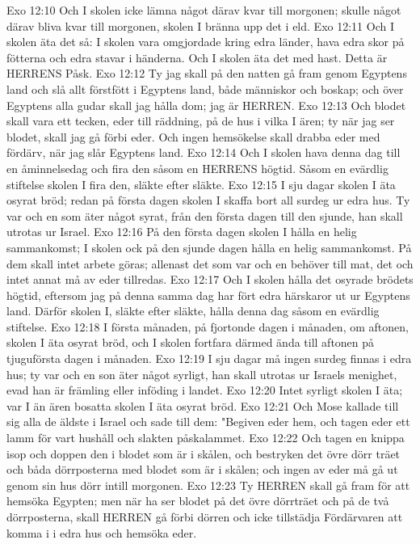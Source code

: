 Exo 12:10  Och I skolen icke lämna något därav kvar till morgonen; skulle något därav bliva kvar till morgonen, skolen I bränna upp det i eld.
Exo 12:11  Och I skolen äta det så: I skolen vara omgjordade kring edra länder, hava edra skor på fötterna och edra stavar i händerna. Och I skolen äta det med hast. Detta är HERRENS Påsk.
Exo 12:12  Ty jag skall på den natten gå fram genom Egyptens land och slå allt förstfött i Egyptens land, både människor och boskap; och över Egyptens alla gudar skall jag hålla dom; jag är HERREN.
Exo 12:13  Och blodet skall vara ett tecken, eder till räddning, på de hus i vilka I ären; ty när jag ser blodet, skall jag gå förbi eder. Och ingen hemsökelse skall drabba eder med fördärv, när jag slår Egyptens land.
Exo 12:14  Och I skolen hava denna dag till en åminnelsedag och fira den såsom en HERRENS högtid. Såsom en evärdlig stiftelse skolen I fira den, släkte efter släkte.
Exo 12:15  I sju dagar skolen I äta osyrat bröd; redan på första dagen skolen I skaffa bort all surdeg ur edra hus. Ty var och en som äter något syrat, från den första dagen till den sjunde, han skall utrotas ur Israel.
Exo 12:16  På den första dagen skolen I hålla en helig sammankomst; I skolen ock på den sjunde dagen hålla en helig sammankomst. På dem skall intet arbete göras; allenast det som var och en behöver till mat, det och intet annat må av eder tillredas.
Exo 12:17  Och I skolen hålla det osyrade brödets högtid, eftersom jag på denna samma dag har fört edra härskaror ut ur Egyptens land. Därför skolen I, släkte efter släkte, hålla denna dag såsom en evärdlig stiftelse.
Exo 12:18  I första månaden, på fjortonde dagen i månaden, om aftonen, skolen I äta osyrat bröd, och I skolen fortfara därmed ända till aftonen på tjuguförsta dagen i månaden.
Exo 12:19  I sju dagar må ingen surdeg finnas i edra hus; ty var och en son äter något syrligt, han skall utrotas ur Israels menighet, evad han är främling eller inföding i landet.
Exo 12:20  Intet syrligt skolen I äta; var I än ären bosatta skolen I äta osyrat bröd.
Exo 12:21  Och Mose kallade till sig alla de äldste i Israel och sade till dem: "Begiven eder hem, och tagen eder ett lamm för vart hushåll och slakten påskalammet.
Exo 12:22  Och tagen en knippa isop och doppen den i blodet som är i skålen, och bestryken det övre dörr träet och båda dörrposterna med blodet som är i skålen; och ingen av eder må gå ut genom sin hus dörr intill morgonen.
Exo 12:23  Ty HERREN skall gå fram för att hemsöka Egypten; men när ha ser blodet på det övre dörrträet och på de två dörrposterna, skall HERREN gå förbi dörren och icke tillstädja Fördärvaren att komma i i edra hus och hemsöka eder.
